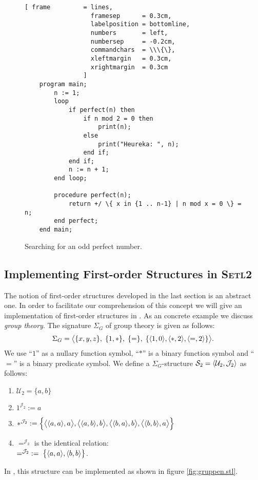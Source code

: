 \begin{figure}[!ht]
  \centering
\begin{Verbatim}[ frame         = lines, 
                  framesep      = 0.3cm, 
                  labelposition = bottomline,
                  numbers       = left,
                  numbersep     = -0.2cm,
                  commandchars  = \\\{\},
                  xleftmargin   = 0.3cm,
                  xrightmargin  = 0.3cm
                ]
    program main;
        n := 1;
        loop
            if perfect(n) then
                if n mod 2 = 0 then
                    print(n);
                else
                    print("Heureka: ", n);
                end if;
            end if;
            n := n + 1;
        end loop;    
    
        procedure perfect(n);
            return +/ \{ x in {1 .. n-1} | n mod x = 0 \} = n;
        end perfect;
    end main;
\end{Verbatim}
\vspace*{-0.3cm}
  \caption{Searching for an odd perfect number.}
  \label{fig:find-perfect.stl}
\end{figure} 



\subsection{Implementing First-order Structures  in \textsc{Setl2}}
The notion of first-order structures developed in the last section is an abstract one.
In order to facilitate our comprehension of this concept we will give an implementation of
first-order structures in \setl.  
As an concrete example we discuss \emph{group theory}.  The signature $\Sigma_G$ of group theory is
given as follows:
\[ \Sigma_G = 
   \bigl\langle \{x,y,z\},\; \{1,*\},\; \{=\},\; \{ \pair(1,0), \pair(*,2), \pair(=,2) \} \bigr\rangle. 
\]
We use  ``$1$'' as a nullary function symbol,  ``$*$'' is a binary
function symbol and ``$=$'' is a binary predicate symbol.
We define a $\Sigma_G$-structure $\mathcal{S}_2 = \langle \mathcal{U}_{2}, \mathcal{J}_{2} \rangle$
as follows:
\begin{enumerate}
\item $\mathcal{U}_{2} = \{ a, b \}$
\item $1^{\mathcal{J}_2} := a$ 
\item $*^{\mathcal{J}_2} := \Bigl\{ \bigl\langle\pair(a,a), a\bigr\rangle,
                                   \bigl\langle\pair(a,b), b\bigr\rangle,
                                   \bigl\langle\pair(b,a), b\bigr\rangle,
                                   \bigl\langle\pair(b,b), a\bigr\rangle \Bigr\}$
\item $=^{\mathcal{J}_2}$ is the identical relation: \\[0.2cm]
       $=^{\mathcal{J}_2} \;:=\; \bigl\{ \pair(a,a), \pair(b,b) \bigr\}$.
\end{enumerate}
In  \setl{}, this structure can be implemented as shown in figure
\ref{fig:gruppen.stl}.

